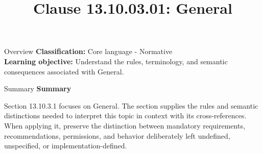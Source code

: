 \documentclass[10pt,letterpaper]{article}
\title{Clause 13.10.03.01: General}
\author{}
\date{}
\begin{document}
\maketitle
\begin{CornellOverviewBox}{Overview}
\textbf{Classification:} Core language - Normative\\[2pt]
\textbf{Learning objective:} Understand the rules, terminology, and semantic consequences associated with General.
\end{CornellOverviewBox}\begin{CornellSummaryBox}{Summary}
{\sffamily\bfseries\color{Accent} Summary}\par\vspace{3pt}Section 13.10.3.1 focuses on General. The section supplies the rules and semantic distinctions needed to interpret this topic in context with its cross-references. When applying it, preserve the distinction between mandatory requirements, recommendations, permissions, and behavior deliberately left undefined, unspecified, or implementation-defined.
\end{CornellSummaryBox}
\end{document}
